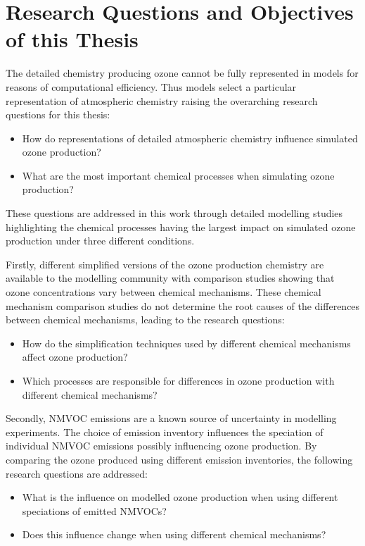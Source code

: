 \section{Research Questions and Objectives of this Thesis} \label{s:research_questions}
The detailed chemistry producing ozone cannot be fully represented in models for reasons of computational efficiency.
Thus models select a particular representation of atmospheric chemistry raising the overarching research questions for this thesis:
\begin{itemize}
    \item How do representations of detailed atmospheric chemistry influence simulated ozone production?
    \item What are the most important chemical processes when simulating ozone production?
\end{itemize}
These questions are addressed in this work through detailed modelling studies highlighting the chemical processes having the largest impact on simulated ozone production under three different conditions.

Firstly, different simplified versions of the ozone production chemistry are available to the modelling community with comparison studies showing that ozone concentrations vary between chemical mechanisms.
These chemical mechanism comparison studies do not determine the root causes of the differences between chemical mechanisms, leading to the research questions:
\begin{itemize}
	\item How do the simplification techniques used by different chemical mechanisms affect ozone production? 
    \item Which processes are responsible for differences in ozone production with different chemical mechanisms?
\end{itemize}

Secondly, NMVOC emissions are a known source of uncertainty in modelling experiments.
The choice of emission inventory influences the speciation of individual NMVOC emissions possibly influencing ozone production.
By comparing the ozone produced using different emission inventories, the following research questions are addressed:
\begin{itemize}
	\item What is the influence on modelled ozone production when using different speciations of emitted NMVOCs? 
    \item Does this influence change when using different chemical mechanisms?
\end{itemize}

